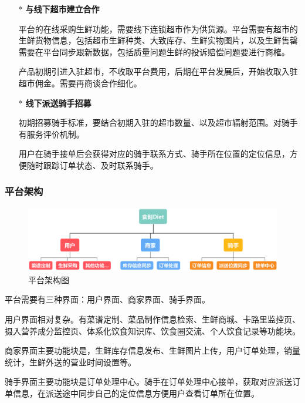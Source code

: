 \documentclass[UTF8,12pt]{ctexart}
\numberwithin{figure}{section}%
\begin{document}
\begin{spacing}{2}
	\begin{itemize}
	\item[*] \textbf{与线下超市建立合作 }
	
	\setlength{\parindent}{2em}平台的在线采购生鲜功能，需要线下连锁超市作为供货源。平台需要有超市的生鲜货物信息，包括超市生鲜种类、大致库存、生鲜实物图片，以及生鲜售罄需要在平台同步跟新数据，包括质量问题生鲜的投诉赔偿问题要进行商榷。		
	
	产品初期引进入驻超市，不收取平台费用，后期在平台发展后，开始收取入驻超市佣金。需要再商谈合作细化。 
	
	\item[*] \textbf{线下派送骑手招募 }
	
	\setlength{\parindent}{2em}初期招募骑手标准，要结合初期入驻的超市数量、以及超市辐射范围。对骑手有服务评价机制。
	
	用户在骑手接单后会获得对应的骑手联系方式、骑手所在位置的定位信息，方便随时跟踪订单状态、及时联系骑手。

\end{itemize}


\subsubsection{平台架构}

\begin{figure}[!htb]
	\centering
	\includegraphics[width=14cm]{fig/pingtaijiagou}
	\caption{平台架构图}
\end{figure}

平台需要有三种界面：用户界面、商家界面、骑手界面。

用户界面相对复杂。有菜谱定制、菜品制作信息检索、生鲜商城、卡路里监控页、摄入营养成分监控页、体系化饮食知识库、饮食圈交流、个人饮食记录等功能块。

商家界面主要功能块是，生鲜库存信息发布、生鲜图片上传，用户订单处理，销量统计，生鲜外送的营业时间设置等。

骑手界面主要功能块是订单处理中心。骑手在订单处理中心接单，获取对应派送订单信息，在派送途中同步自己的定位信息方便用户查看订单所在位置。


\newpage

\end{spacing}
\end{document}
